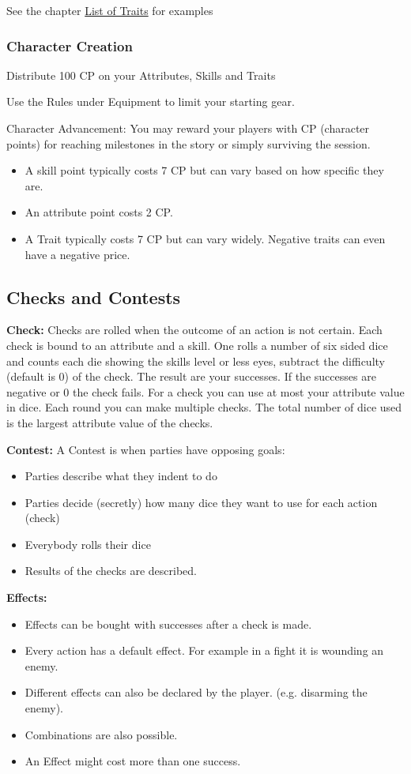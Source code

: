 \documentclass[11pt]{article}
\begin{document}
{\begin{multicols}{2}[]
See the chapter \hyperref[sec:org8e4cfa9]{List of Traits} for examples

\subsubsection{Character Creation}
\label{sec:orgcf274ca}
Distribute 100 CP on your Attributes, Skills and Traits

Use the Rules under Equipment to limit your starting gear.

Character Advancement:
You may reward your players with CP (character points) for reaching milestones in the story or simply surviving the session.

\begin{itemize}
\item A skill point typically costs 7 CP but can vary based on how specific they are.
\item An attribute point costs 2 CP.
\item A Trait typically costs 7 CP but can vary widely. Negative traits can even have a negative price.
\end{itemize}

\subsection{Checks and Contests}
\label{sec:org0f646d2}
\textbf{Check:}
Checks are rolled when the outcome of an action is not certain. Each check is bound to an attribute and a skill. One rolls a number of six sided dice and counts each die showing the skills level or less eyes, subtract the difficulty (default is 0) of the check. The result are your successes. If the successes are negative or 0 the check fails. For a check you can use at most your attribute value in dice.
Each round you can make multiple checks. The total number of dice used is the largest attribute value of the checks. 

\textbf{Contest:}
A Contest is when parties have opposing goals:
\begin{itemize}
\item Parties describe what they indent to do
\item Parties decide (secretly) how many dice they want to use for each action (check)
\item Everybody rolls their dice
\item Results of the checks are described.
\end{itemize}

\textbf{Effects:}
\begin{itemize}
\item Effects can be bought with successes after a check is made.
\item Every action has a default effect. For example in a fight it is wounding an enemy.
\item Different effects can also be declared by the player. (e.g. disarming the enemy).
\item Combinations are also possible.
\item An Effect might cost more than one success.
\end{itemize}


\end{multicols}}
\end{document}
